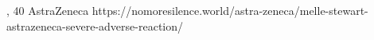           {, }
          {40}
          {AstraZeneca}
          {}
          {
          }
          {https://nomoresilence.world/astra-zeneca/melle-stewart-astrazeneca-severe-adverse-reaction/}


